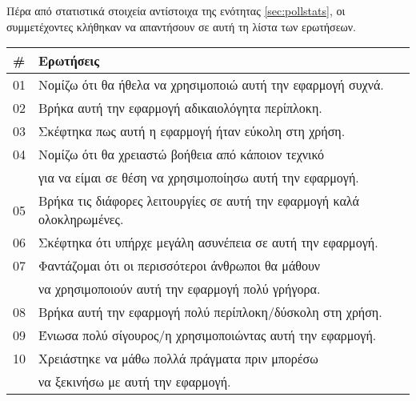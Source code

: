            Πέρα από στατιστικά στοιχεία αντίστοιχα της ενότητας \ref{sec:pollstats}, οι συμμετέχοντες κλήθηκαν να απαντήσουν σε αυτή τη λίστα των ερωτήσεων.

            \begin{table}[H] \noindent\centering\small
                    \begin{tabular}{l|l}
                        \# & \textbf{Ερωτήσεις} \\
                        \midrule
                        01 & Νομίζω ότι θα ήθελα να χρησιμοποιώ αυτή την εφαρμογή συχνά. \\
                        \midrule
                        02 & Βρήκα αυτή την εφαρμογή αδικαιολόγητα περίπλοκη. \\
                        \midrule
                        03 & Σκέφτηκα πως αυτή η εφαρμογή ήταν εύκολη στη χρήση. \\
                        \midrule
                        04 & Νομίζω ότι θα χρειαστώ βοήθεια από κάποιον τεχνικό \\
                          & για να είμαι σε θέση να χρησιμοποίησω αυτή την εφαρμογή. \\
                        \midrule
                        05 & Βρήκα τις διάφορες λειτουργίες σε αυτή την εφαρμογή καλά ολοκληρωμένες. \\
                        \midrule
                        06 & Σκέφτηκα ότι υπήρχε μεγάλη ασυνέπεια σε αυτή την εφαρμογή. \\
                        \midrule
                        07 & Φαντάζομαι ότι οι περισσότεροι άνθρωποι θα μάθουν \\
                          & να χρησιμοποιούν αυτή την εφαρμογή πολύ γρήγορα. \\
                        \midrule
                        08 & Βρήκα αυτή την εφαρμογή πολύ περίπλοκη/δύσκολη στη χρήση. \\
                        \midrule
                        09 & Ένιωσα πολύ σίγουρος/η χρησιμοποιώντας αυτή την εφαρμογή. \\
                        \midrule
                        10 & Χρειάστηκε να μάθω πολλά πράγματα πριν μπορέσω \\
                           & να ξεκινήσω με αυτή την εφαρμογή. \\
                    \end{tabular}
            \end{table}

